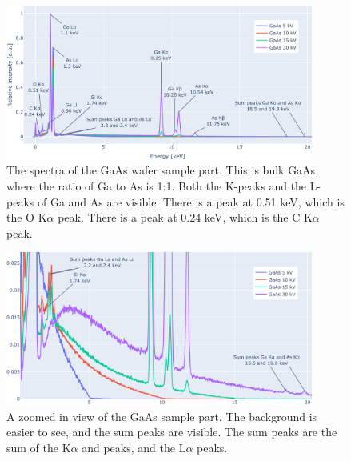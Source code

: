 \begin{figure}[p] %
    \centering
    \includegraphics[width=0.90\textwidth]{figures/each_spectra/GaAs_everything.png}
    \caption{
        The spectra of the GaAs wafer sample part.
        This is bulk GaAs, where the ratio of Ga to As is 1:1.
        Both the K-peaks and the L-peaks of Ga and As are visible.
        There is a peak at 0.51 keV, which is the O K$\alpha$ peak.
        There is a peak at 0.24 keV, which is the C K$\alpha$ peak.
    }
    \label{fig:results:Spectra_GaAs}
\end{figure}


\begin{figure}[p]
    \centering
    \includegraphics[width=0.90\textwidth]{figures/each_spectra/GaAs_bg_and_sum_peaks.png}
    \caption{
        A zoomed in view of the GaAs sample part.
        The background is easier to see, and the sum peaks are visible.
        The sum peaks are the sum of the K$\alpha$ and peaks, and the L$\alpha$ peaks.
    }
    \label{fig:results:Spectra_GaAs_bg_and_sum_peaks}
\end{figure}


